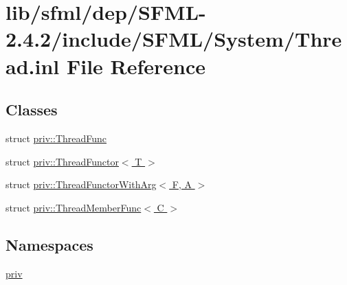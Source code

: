 \hypertarget{sfml_2dep_2_s_f_m_l-2_84_82_2include_2_s_f_m_l_2_system_2_thread_8inl}{\section{lib/sfml/dep/\-S\-F\-M\-L-\/2.4.2/include/\-S\-F\-M\-L/\-System/\-Thread.inl File Reference}
\label{sfml_2dep_2_s_f_m_l-2_84_82_2include_2_s_f_m_l_2_system_2_thread_8inl}
}
\subsection*{Classes}
\begin{DoxyCompactItemize}
\item 
struct \hyperlink{structpriv_1_1_thread_func}{priv\-::\-Thread\-Func}
\item 
struct \hyperlink{structpriv_1_1_thread_functor}{priv\-::\-Thread\-Functor$<$ T $>$}
\item 
struct \hyperlink{structpriv_1_1_thread_functor_with_arg}{priv\-::\-Thread\-Functor\-With\-Arg$<$ F, A $>$}
\item 
struct \hyperlink{structpriv_1_1_thread_member_func}{priv\-::\-Thread\-Member\-Func$<$ C $>$}
\end{DoxyCompactItemize}
\subsection*{Namespaces}
\begin{DoxyCompactItemize}
\item 
\hyperlink{namespacepriv}{priv}
\end{DoxyCompactItemize}
